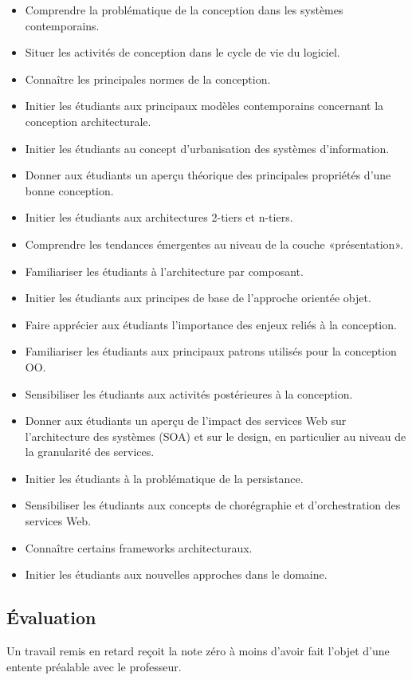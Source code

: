 \documentclass{article}
\begin{document}
\begin{itemize}
\item Comprendre la problématique de la conception dans les systèmes contemporains.
\item Situer les activités de conception dans le cycle de vie du logiciel.
\item Connaître les principales normes de la conception.
\item Initier les étudiants aux principaux modèles contemporains concernant la conception architecturale.
\item Initier les étudiants au concept d'urbanisation des systèmes d'information.
\item Donner aux étudiants un aperçu théorique des principales propriétés d'une bonne conception.
\item Initier les étudiants aux architectures 2-tiers et n-tiers.
\item Comprendre les tendances émergentes au niveau de la couche «présentation».
\item Familiariser les étudiants à l'architecture par composant.
\item Initier les étudiants aux principes de base de l'approche orientée objet.
\item Faire apprécier aux étudiants l'importance des enjeux reliés à la conception.
\item Familiariser les étudiants aux principaux patrons utilisés pour la conception OO.
\item Sensibiliser les étudiants aux activités postérieures à la conception.
\item Donner aux étudiants un aperçu de l'impact des services Web sur l'architecture des systèmes (SOA) et sur le design, en particulier au niveau de la granularité des services.
\item Initier les étudiants à la problématique de la persistance.
\item Sensibiliser les étudiants aux concepts de chorégraphie et d'orchestration des services Web.
\item Connaître certains frameworks architecturaux.
\item Initier les étudiants aux nouvelles approches dans le domaine.
\end{itemize}

\subsection{Évaluation}
\label{sub:Evaluation}
Un travail remis en retard reçoit la note zéro à moins d'avoir fait l'objet d'une entente préalable avec le professeur. 
\end{document}
